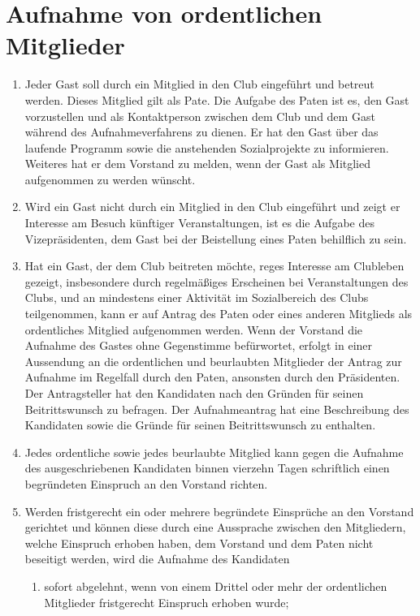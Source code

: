 \documentclass{statutclass}
\begin{document}
\section{Aufnahme von ordentlichen Mitglieder}
\begin{enumerate}
    \item Jeder Gast soll durch ein Mitglied in den Club eingeführt und betreut werden. Dieses Mitglied gilt als Pate. Die Aufgabe des Paten ist es, den Gast vorzustellen und als Kontaktperson zwischen dem Club und dem Gast während des Aufnahmeverfahrens zu dienen. Er hat den Gast über das laufende Programm sowie die anstehenden Sozialprojekte zu informieren. Weiteres hat er dem Vorstand zu melden, wenn der Gast als Mitglied aufgenommen zu werden wünscht.
    \item Wird ein Gast nicht durch ein Mitglied in den Club eingeführt und zeigt er Interesse am Besuch künftiger Veranstaltungen, ist es die Aufgabe des Vizepräsidenten, dem Gast bei der Beistellung eines Paten behilflich zu sein.
    \item Hat ein Gast, der dem Club beitreten möchte, reges Interesse am Clubleben gezeigt, insbesondere durch regelmäßiges Erscheinen bei Veranstaltungen des Clubs, und an mindestens einer Aktivität im Sozialbereich des Clubs teilgenommen, kann er auf Antrag des Paten oder eines anderen Mitglieds als ordentliches Mitglied aufgenommen werden. Wenn der Vorstand die Aufnahme des Gastes ohne Gegenstimme befürwortet, erfolgt in einer Aussendung an die ordentlichen und beurlaubten Mitglieder der Antrag zur Aufnahme im Regelfall durch den Paten, ansonsten durch den Präsidenten. Der Antragsteller hat den Kandidaten nach den Gründen für seinen Beitrittswunsch zu befragen. Der Aufnahmeantrag hat eine Beschreibung des Kandidaten sowie die Gründe für seinen Beitrittswunsch zu enthalten.
    \item Jedes ordentliche sowie jedes beurlaubte Mitglied kann gegen die Aufnahme des ausgeschriebenen Kandidaten binnen vierzehn Tagen schriftlich einen begründeten Einspruch an den Vorstand richten.
    \item Werden fristgerecht ein oder mehrere begründete Einsprüche an den Vorstand gerichtet und können diese durch eine Aussprache zwischen den Mitgliedern, welche Einspruch erhoben haben, dem Vorstand und dem Paten nicht beseitigt werden, wird die Aufnahme des Kandidaten
    \begin{enumerate}
        \item sofort abgelehnt, wenn von einem Drittel oder mehr der ordentlichen Mitglieder fristgerecht Einspruch erhoben wurde;

\end{enumerate}
\end{enumerate}
\end{document}
